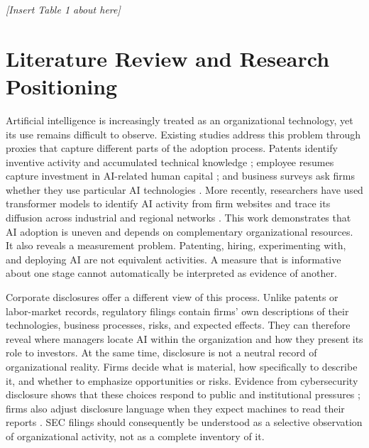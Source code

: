 \documentclass[12pt]{article}
\newcommand{\placement}[1]{%
  \begin{center}
    \vspace{0.5\baselineskip}
    \textit{[Insert #1 about here]}
    \vspace{0.5\baselineskip}
  \end{center}
}
\begin{document}
\placement{Table 1}

\section{Literature Review and Research Positioning}
\label{sec:literature}

Artificial intelligence is increasingly treated as an organizational
technology, yet its use remains difficult to observe. Existing studies address
this problem through proxies that capture different parts of the adoption
process. Patents identify inventive activity and accumulated technical
knowledge \citep{igna2023innovation}; employee resumes capture investment
in AI-related human capital \citep{babina2024growth}; and business surveys
ask firms whether they use particular AI technologies
\citep{mcelheran2024adoption}. More recently, researchers have used
transformer models to identify AI activity from firm websites and trace its
diffusion across industrial and regional networks
\citep{dahlke2024epidemic}. This work demonstrates that AI adoption is
uneven and depends on complementary organizational resources. It also reveals
a measurement problem. Patenting, hiring, experimenting with, and deploying AI
are not equivalent activities. A measure that is informative about one stage
cannot automatically be interpreted as evidence of another.

Corporate disclosures offer a different view of this process. Unlike patents
or labor-market records, regulatory filings contain firms' own descriptions of
their technologies, business processes, risks, and expected effects. They can
therefore reveal where managers locate AI within the organization and how they
present its role to investors. At the same time, disclosure is not a neutral
record of organizational reality. Firms decide what is material, how
specifically to describe it, and whether to emphasize opportunities or risks.
Evidence from cybersecurity disclosure shows that these choices respond to
public and institutional pressures \citep{darcy2022disclosures}; firms also
adjust disclosure language when they expect machines to read their reports
\citep{cao2023machine}. SEC filings should consequently be understood as a
selective observation of organizational activity, not as a complete inventory
of it.
\end{document}
